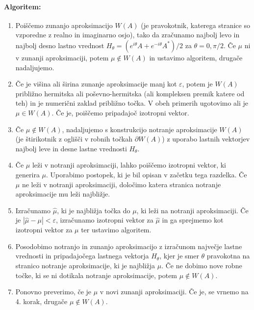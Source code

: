 \documentclass[12pt,a4paper]{amsart}
\theoremstyle{definition}
\theoremstyle{plain}
\newcommand{\abs}[1]{ \left\lvert#1\right\rvert}
\begin{document}
\paragraph{Algoritem:}
\begin{enumerate}[1.]
\item Poiščemo zunanjo aproksimacijo $W(A)$ (je pravokotnik, katerega stranice so vzporedne z realno in imaginarno osjo), tako da zračunamo najbolj levo in najbolj desno lastno vrednost $H_\theta =(e^{i\theta}A+e^{-i\theta}A^\ast)/2$ za $\theta =0, \pi/2$. %
Če $\mu$ ni v zunanji aproksimaciji, potem $\mu \not \in W(A)$ in ustavimo algoritem, drugače nadaljujemo.
\item Če je višina ali širina zunanje aproksimacije manj kot $\varepsilon$, potem je $W(A)$ približno hermitska ali poševno-hermitska (ali kompleksen premik katere od teh) in je numerični zaklad približno točka. V obeh primerih ugotovimo ali je $\mu \in W(A)$. Če je, poiščemo pripadajoč izotropni vektor. 
\item Če $\mu \not \in W(A)$, nadaljujemo s konstrukcijo notranje aproksimacije $W(A)$ (je štirikotnik z oglišči v robnih točkah $\partial W(A)$) z uporabo lastnih vektorjev najbolj leve in desne lastne vrednosti $H_{\theta}$.%
\item  Če $\mu$ leži v notranji aproksimaciji, lahko poiščemo izotropni vektor, ki generira $\mu$. Uporabimo postopek, ki je bil opisan v začetku tega razdelka. %
Če $\mu$ ne leži v notranji aproksimaciji, določimo katera stranica notranje aproksimacije mu leži najbližje.
\item  Izračunamo $\hat{\mu}$, ki je najbližja točka do $\mu$, ki leži na notranji aproksimaciji. Če je $\abs{\hat{\mu}-\mu}<\varepsilon$, izračunamo izotropni vektor za $\hat{\mu}$ in ga sprejmemo kot izotropni vektor za $\mu$ ter ustavimo algoritem.
\item Posodobimo notranjo in zunanjo aproksimacijo z izračunom največje lastne vrednosti in pripadajočega lastnega vektorja $H_{\theta}$, kjer je smer $\theta$ pravokotna na stranico notranje aproksimacije, ki je najbližja $\mu$. Če ne dobimo nove robne točke, ki se ni dotikala notranje aproksimacije, potem $\mu \not \in W(A)$. 
\item Ponovno preverimo, če je $\mu$  v novi zunanji aproksimaciji. Če je, se vrnemo na 4. korak, drugače $\mu \not \in W(A)$. 
\end{enumerate}
\end{document}

